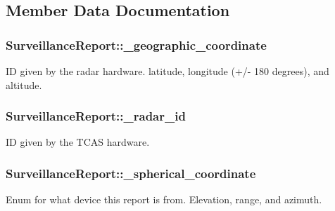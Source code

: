 \subsection{Member Data Documentation}
\hypertarget{class_surveillance_report_a1dde505984eed4842bf8859bfb8c2bd7}{}
\subsubsection[{\+\_\+geographic\+\_\+coordinate}]{ Surveillance\+Report\+::\+\_\+geographic\+\_\+coordinate\hspace{0.3cm}{\ttfamily [protected]}}\label{class_surveillance_report_a1dde505984eed4842bf8859bfb8c2bd7}
I\+D given by the radar hardware. latitude, longitude (+/-\/ 180 degrees), and altitude. \hypertarget{class_surveillance_report_ab8d269722a214afb6b27daad622e8ee5}{}
\subsubsection[{\+\_\+radar\+\_\+id}]{ Surveillance\+Report\+::\+\_\+radar\+\_\+id\hspace{0.3cm}{\ttfamily [protected]}}\label{class_surveillance_report_ab8d269722a214afb6b27daad622e8ee5}
I\+D given by the T\+C\+A\+S hardware. \hypertarget{class_surveillance_report_a4ea35b8925d95682e468f92b297e7cc6}{}
\subsubsection[{\+\_\+spherical\+\_\+coordinate}]{ Surveillance\+Report\+::\+\_\+spherical\+\_\+coordinate}\label{class_surveillance_report_a4ea35b8925d95682e468f92b297e7cc6}
Enum for what device this report is from. Elevation, range, and azimuth. \hypertarget{class_surveillance_report_a87dcfc53aefdb626b6d6968ee7d0fc88}{}
